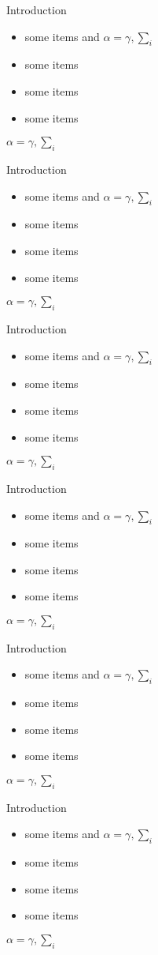 \documentclass{beamer}
\begin{document}
\begin{frame}{}
\begin{columns}[T]
\begin{column}{.48\linewidth}
\begin{block}{Introduction}
\begin{itemize}
\item some items and $\alpha=\gamma, \sum_{i}$
\item some items
\item some items
\item some items
\end{itemize}
$\alpha=\gamma, \sum_{i}$
\end{block}
\begin{block}{Introduction}
\begin{itemize}
\item some items and $\alpha=\gamma, \sum_{i}$
\item some items
\item some items
\item some items
\end{itemize}
$\alpha=\gamma, \sum_{i}$
\end{block}
\begin{block}{Introduction}
\begin{itemize}
\item some items and $\alpha=\gamma, \sum_{i}$
\item some items
\item some items
\item some items
\end{itemize}
$\alpha=\gamma, \sum_{i}$
\end{block}
\begin{block}{Introduction}
\begin{itemize}
\item some items and $\alpha=\gamma, \sum_{i}$
\item some items
\item some items
\item some items
\end{itemize}
$\alpha=\gamma, \sum_{i}$
\end{block}
\begin{block}{Introduction}
\begin{itemize}
\item some items and $\alpha=\gamma, \sum_{i}$
\item some items
\item some items
\item some items
\end{itemize}
$\alpha=\gamma, \sum_{i}$
\end{block}
\begin{block}{Introduction}
\begin{itemize}
\item some items and $\alpha=\gamma, \sum_{i}$
\item some items
\item some items
\item some items
\end{itemize}
$\alpha=\gamma, \sum_{i}$
\end{block}


\end{column}
\end{columns}
\end{frame}
\end{document}
